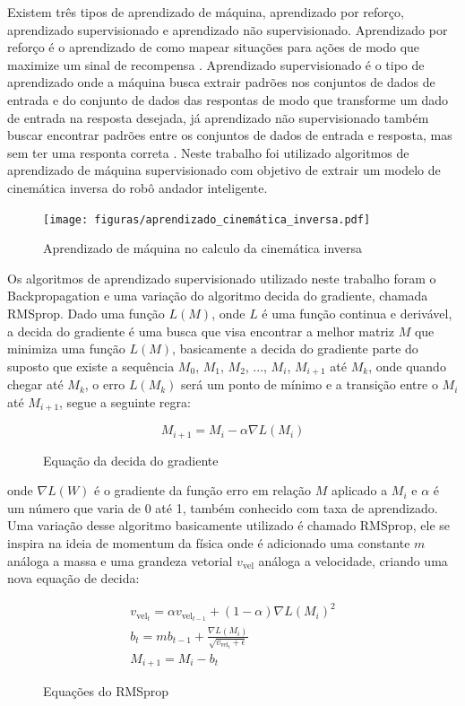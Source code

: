 Existem três tipos de aprendizado de máquina, aprendizado por reforço,
aprendizado supervisionado e aprendizado não supervisionado.
Aprendizado por reforço é o aprendizado de como mapear situações
para ações de modo que maximize um sinal de recompensa
\cite{sutton2018reinforcement}. Aprendizado supervisionado é o
tipo de aprendizado onde a máquina busca extrair padrões nos conjuntos
de dados de entrada  e do conjunto de dados das respontas de modo que
transforme um dado de entrada na resposta desejada, já aprendizado não
supervisionado também buscar encontrar padrões entre os conjuntos de
dados de entrada e resposta, mas sem ter uma responta correta
\cite{trask2019grokking}. Neste trabalho foi utilizado algoritmos de
aprendizado de máquina supervisionado com objetivo de extrair um modelo de
cinemática inversa do robô andador inteligente.

\begin{figure}[H]
    \centering
    \texttt{[image: figuras/aprendizado\_cinemática\_inversa.pdf]}
    \caption{Aprendizado de máquina no calculo da cinemática inversa}
\end{figure}

Os algoritmos de aprendizado supervisionado utilizado neste trabalho
foram o Backpropagation e uma variação do algoritmo decida do gradiente, chamada
RMSprop.
Dado uma função $L(M)$, onde $L$ é uma função continua e derivável,
a decida do gradiente é uma busca que visa encontrar
a melhor matriz $M$ que minimiza uma função $L(M)$, basicamente a
decida do gradiente parte do suposto que existe a sequência
$M_0$, $M_1$, $M_2$, ..., $M_i$, $M_{i+1}$ até $M_k$, onde quando
chegar até $M_k$, o erro $L(M_k)$ será um ponto de mínimo e a transição
entre o $M_{i}$ até $M_{i+1}$, segue a seguinte regra:

\begin{figure}[H]
    \[
        M_{i+1} = M_i -\alpha \nabla L(M_i)
    \]
    \caption{Equação da decida do gradiente}
\end{figure}

onde $\nabla L(W)$ é o gradiente da função erro em relação $M$ aplicado
a $M_i$ e $\alpha$ é um número que varia de 0 até 1,
também conhecido com taxa de aprendizado. Uma variação desse algoritmo
basicamente utilizado é chamado RMSprop, ele se inspira na ideia de momentum
da física  onde  é adicionado uma constante $m$ análoga a massa e uma grandeza
vetorial $v_{\text{vel}}$ análoga a velocidade, criando uma nova equação de decida:

\begin{figure}[H]
    \begin{align*}
        v_{\text{vel}_t} = \alpha v_{\text{vel}_{t-1}} + (1 - \alpha)\nabla L(M_i)^2 \\
        b_t = mb_{t-1} + \frac{\nabla L(M_i)}{\sqrt{v_{\text{vel}_t} + \epsilon}} \\
        M_{i+1} = M_i - b_t
    \end{align*}
    \caption{Equações do RMSprop}
\end{figure}

